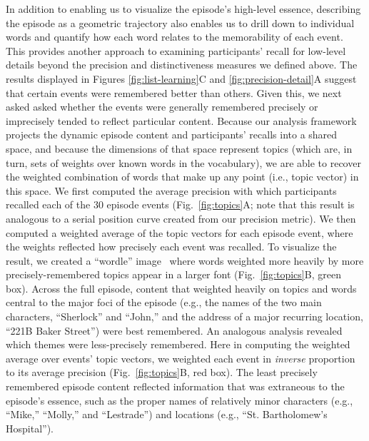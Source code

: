 \documentclass[10pt]{article}
\begin{document}
In addition to enabling us to visualize the episode's high-level essence, describing the episode as a geometric trajectory also enables us to drill down to individual words and quantify how each word relates to the memorability of each event.  This provides another approach to examining participants' recall for low-level details beyond the precision and distinctiveness measures we defined above.  The results displayed in Figures \ref{fig:list-learning}C and \ref{fig:precision-detail}A suggest that certain events were remembered better than others.  Given this, we next asked asked whether the events were generally remembered precisely or imprecisely tended to reflect particular content.  Because our analysis framework projects the dynamic episode content and participants' recalls into a shared space, and because the dimensions of that space represent topics (which are, in turn, sets of weights over known words in the vocabulary), we are able to recover the weighted combination of words that make up any point (i.e., topic vector) in this space.  We first computed the average precision with which participants recalled each of the 30 episode events (Fig.~\ref{fig:topics}A; note that this result is analogous to a serial position curve created from our precision metric).  We then computed a weighted average of the topic vectors for each episode event, where the weights reflected how precisely each event was recalled.  To visualize the result, we created a ``wordle'' image~\citep{MuelEtal18} where words weighted more heavily by more precisely-remembered topics appear in a larger font (Fig.~\ref{fig:topics}B, green box).  Across the full episode, content that weighted heavily on topics and words central to the major foci of the episode (e.g., the names of the two main characters, ``Sherlock'' and ``John,'' and the address of a major recurring location, ``221B Baker Street'') were best remembered.  An analogous analysis revealed which themes were less-precisely remembered.  Here in computing the weighted average over events' topic vectors, we weighted each event in \textit{inverse} proportion to its average precision (Fig.~\ref{fig:topics}B, red box).  The least precisely remembered episode content reflected information that was extraneous to the episode's essence, such as the proper names of relatively minor characters (e.g., ``Mike,'' ``Molly,'' and ``Lestrade'') and locations (e.g., ``St. Bartholomew's Hospital'').
\end{document}
